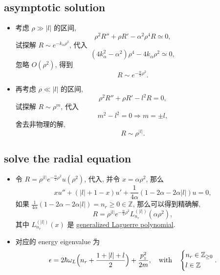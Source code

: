 \subsection{asymptotic solution}
\begin{itemize}
	\item 考虑 $\rho \gg |l|$ 的区间,
	\begin{equation}
		\rho^2 R'' + \rho R' - \alpha^2 \rho^4 R \simeq 0,
	\end{equation}
	试探解 $R \sim e^{- k_\alpha \rho^2}$, 代入
	\begin{equation}
		(4 k_\alpha^2 - \alpha^2) \rho^4 - 4 k_\alpha \rho^2 \simeq 0,
	\end{equation}
	忽略 $O(\rho^2)$, 得到
	\begin{equation}
		R \sim e^{- \frac{\alpha}{2} \rho^2}.
	\end{equation}
	
	\item 再考虑 $\rho \ll |l|$ 的区间,
	\begin{equation}
		\rho^2 R'' + \rho R' - l^2 R = 0,
	\end{equation}
	试探解 $R \sim \rho^m$, 代入
	\begin{equation}
		m^2 - l^2 = 0 \Longrightarrow m = \pm l,
	\end{equation}
	舍去非物理的解,
	\begin{equation}
		R \sim \rho^{|l|}.
	\end{equation}
\end{itemize}

\subsection{solve the radial equation}
\begin{itemize}
	\item 令 $R = \rho^{|l|} e^{- \frac{\alpha}{2} \rho^2} u(\rho^2)$, 代入, 并令 $x = \alpha \rho^2$, 那么
	\begin{equation}
		x u'' + (|l| + 1 - x) u' + \frac{1}{4 \alpha} (1 - 2 \alpha - 2 \alpha |l|) u = 0,
	\end{equation}
	如果 $\frac{1}{4 \alpha} (1 - 2 \alpha - 2 \alpha |l|) = n_r \geq 0 \in \mathbb{Z}$, 那么可以得到精确解,
	\begin{equation}
		R = \rho^{|l|} e^{- \frac{\alpha}{2} \rho^2} L_{n_r}^{(|l|)}(\alpha \rho^2),
	\end{equation}
	其中 $L_{n_r}^{(|l|)}(x)$ 是 \href{https://en.wikipedia.org/wiki/Laguerre_polynomials#Generalized_Laguerre_polynomials}{generalized Laguerre polynomial}.
	
	\item 对应的 energy eigenvalue 为
	\begin{equation} \label{A.1.14}
		\epsilon = 2 \hbar \omega_L \Big( n_r + \frac{1 + |l| + l}{2} \Big) + \frac{p_z^2}{2 m}, \quad \text{with} \quad \begin{dcases}
			n_r \in \mathbb{Z}_{\geq 0} \\
			l \in \mathbb{Z}
		\end{dcases}.
	\end{equation}
\end{itemize}

